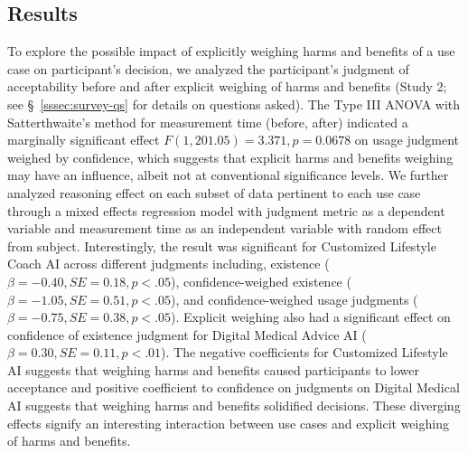 \subsection{Results}\label{sssec:a-results}
To explore the possible impact of explicitly weighing harms and benefits of a use case on participant's decision, we analyzed the participant's judgment of acceptability before and after explicit weighing of harms and benefits (Study 2; see \S~\ref{sssec:survey-qs} for details on questions asked). The Type III ANOVA with Satterthwaite's method for measurement time (before, after) indicated a marginally significant effect \( F(1, 201.05) = 3.371, p = 0.0678 \) on usage judgment weighed by confidence, which suggests that explicit harms and benefits weighing may have an influence, albeit not at conventional significance levels. We further analyzed reasoning effect on each subset of data pertinent to each use case through a mixed effects regression model with judgment metric as a dependent variable and measurement time as an independent variable with random effect from subject. Interestingly, the result was significant for Customized Lifestyle Coach AI across different judgments including, existence ($\beta=-0.40,SE=0.18,p<.05$), confidence-weighed existence ($\beta=-1.05,SE=0.51,p<.05$), and confidence-weighed usage judgments ($\beta=-0.75,SE=0.38,p<.05$). Explicit weighing also had a significant effect on confidence of existence judgment for Digital Medical Advice AI ($\beta=0.30,SE=0.11,p<.01$). The negative coefficients for Customized Lifestyle AI suggests that weighing harms and benefits caused participants to lower acceptance and positive coefficient to confidence on judgments on Digital Medical AI suggests that weighing harms and benefits solidified decisions. These diverging effects signify an interesting interaction between use cases and explicit weighing of harms and benefits.

% 

